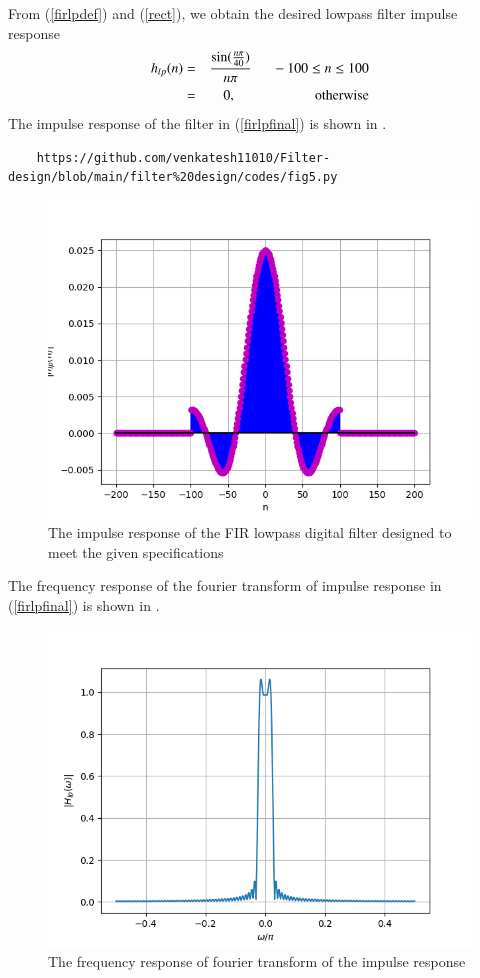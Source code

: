 \documentclass{article}
\begin{document}
From (\ref{firlpdef}) and (\ref{rect}), we obtain the desired lowpass filter impulse response
\begin{eqnarray}
\label{firlpfinal}
h_{lp}(n) &=& \frac{\sin(\frac{n\pi}{40})}{n\pi} \indent -100 \leq n \leq 100 \nonumber \\
&=& 0, \hspace{2cm} \mbox{otherwise}
\end{eqnarray}
The impulse  response of the filter in (\ref{firlpfinal}) is shown in .
\begin{lstlisting}
	https://github.com/venkatesh11010/Filter-design/blob/main/filter%20design/codes/fig5.py
\end{lstlisting}
\begin{figure}[H]
\includegraphics[width = \columnwidth]{figs/hlp.png}
\caption{The impulse response of the FIR lowpass digital filter designed to meet the given specifications} 
\label{fig6}
\end{figure}

The frequency response of the fourier transform of impulse response in (\ref{firlpfinal}) is shown in . 
\begin{figure}[H]
\includegraphics[width = \columnwidth]{figs/Hlp.png}
\caption{The frequency response of fourier transform of the impulse response}
\label{fig7}
\end{figure}
\end{document}
